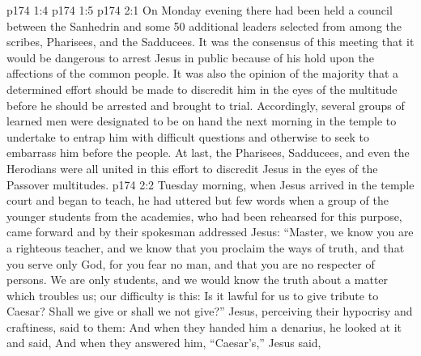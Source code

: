 \vs p174 1:4 
\vs p174 1:5 
\vs p174 2:1 On Monday evening there had been held a council between the Sanhedrin and some 50 additional leaders selected from among the scribes, Pharisees, and the Sadducees. It was the consensus of this meeting that it would be dangerous to arrest Jesus in public because of his hold upon the affections of the common people. It was also the opinion of the majority that a determined effort should be made to discredit him in the eyes of the multitude before he should be arrested and brought to trial. Accordingly, several groups of learned men were designated to be on hand the next morning in the temple to undertake to entrap him with difficult questions and otherwise to seek to embarrass him before the people. At last, the Pharisees, Sadducees, and even the Herodians were all united in this effort to discredit Jesus in the eyes of the Passover multitudes.
\vs p174 2:2 Tuesday morning, when Jesus arrived in the temple court and began to teach, he had uttered but few words when a group of the younger students from the academies, who had been rehearsed for this purpose, came forward and by their spokesman addressed Jesus: “Master, we know you are a righteous teacher, and we know that you proclaim the ways of truth, and that you serve only God, for you fear no man, and that you are no respecter of persons. We are only students, and we would know the truth about a matter which troubles us; our difficulty is this: Is it lawful for us to give tribute to Caesar? Shall we give or shall we not give?” Jesus, perceiving their hypocrisy and craftiness, said to them:  And when they handed him a denarius, he looked at it and said,  And when they answered him, “Caesar’s,” Jesus said, 
